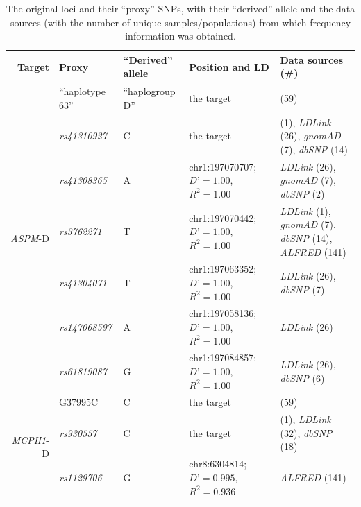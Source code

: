 \documentclass[twoside,twocolumn]{article}
\begin{document}
\begin{table}[h]
	\caption{The original loci and their ``proxy'' SNPs, with their ``derived'' allele and the data sources (with the number of unique samples/populations) from which frequency information was obtained.}
	\label{Tab:snps_in_ld}
	\centering
	\begin{tabularx}{\textwidth}{|r|X|X|X|X|}
		\toprule
		\textbf{Target} & \textbf{Proxy} & \textbf{``Derived'' allele} & \textbf{Position and LD} & \textbf{Data sources (\#)} \\
		\midrule
		\multirow{7}{*}{\textit{ASPM}-D} & ``haplotype 63'' & ``haplogroup D'' & the target & \citet{mekelbobrov_aspm_2005} (59) \\
		& \textit{rs41310927} & C & the target & \citet{wong_sciadv_2020} (1), \textit{LDLink} (26), \textit{gnomAD} (7), \textit{dbSNP} (14) \\
		& \textit{rs41308365} & A & chr1:197070707; $D’=1.00$, $R^2=1.00$ & \textit{LDLink} (26), \textit{gnomAD} (7), \textit{dbSNP} (2) \\
		& \textit{rs3762271} & T & chr1:197070442; $D’=1.00$, $R^2=1.00$ & \textit{LDLink} (1), \textit{gnomAD} (7), \textit{dbSNP} (14), \textit{ALFRED} (141) \\
		& \textit{rs41304071} & T & chr1:197063352; $D’=1.00$, $R^2=1.00$ & \textit{LDLink} (26), \textit{dbSNP} (7) \\
		& \textit{rs147068597} & A & chr1:197058136; $D’=1.00$, $R^2=1.00$ & \textit{LDLink} (26) \\
		& \textit{rs61819087} & G & chr1:197084857; $D’=1.00$, $R^2=1.00$ & \textit{LDLink} (26), \textit{dbSNP} (6) \\
		\midrule
		\multirow{3}{*}{\textit{MCPH1}-D} & G37995C & C & the target & \citet{evans_microcephalin_2005} (59) \\
		& \textit{rs930557} & C & the target & \citet{wong_sciadv_2020} (1), \textit{LDLink} (32), \textit{dbSNP} (18) \\
		& \textit{rs1129706} & G & chr8:6304814; $D’=0.995$, $R^2=0.936$ & \textit{ALFRED} (141) \\
		\bottomrule
	\end{tabularx}
\end{table}
\end{document}
